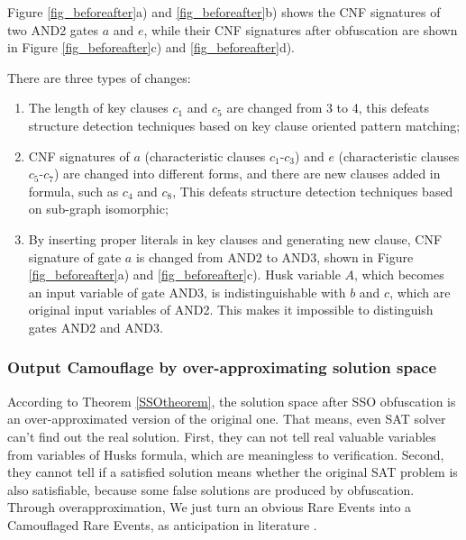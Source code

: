\documentclass[conference]{IEEEtran}
\begin{document}
Figure \ref{fig_beforeafter}a) and \ref{fig_beforeafter}b) shows the CNF signatures of two AND2 gates $a$ and $e$,
while their CNF signatures after obfuscation are shown in Figure \ref{fig_beforeafter}c) and \ref{fig_beforeafter}d).

There are three types of changes:
\begin{enumerate}
 \item
 The length of key clauses $c_1$ and $c_5$ are changed from 3 to 4,
this defeats structure detection techniques \cite{csFu} based on key clause oriented pattern matching;
 \item
CNF signatures of $a$ (characteristic clauses $c_1$-$c_3$) and $e$ (characteristic clauses $c_5$-$c_7$) are changed into different forms,
and there are new clauses added in formula, such as $c_4$ and $c_8$,
This defeats structure detection techniques\cite{csRoy} based on sub-graph isomorphic;
\item 
 By inserting proper literals in key clauses and generating new clause,
 CNF signature of gate $a$ is changed from AND2 to AND3,
shown in Figure \ref{fig_beforeafter}a) and \ref{fig_beforeafter}c).
Husk variable $A$,
which becomes an input variable of gate AND3,
is indistinguishable with $b$ and $c$,
which are original input variables of AND2.
This makes it impossible to distinguish gates AND2 and AND3.
\end{enumerate}

\subsubsection{Output Camouflage by over-approximating solution space}
According to Theorem \ref{SSOtheorem},
the solution space after SSO obfuscation is an over-approximated version of the original one.
That means, even SAT solver can't find out the real solution.
First, they can not tell real valuable variables from variables of Husks formula, 
which are meaningless to verification.
Second, they cannot tell if a satisfied solution means whether the original SAT problem is also satisfiable,
because some false solutions are produced by obfuscation.
Through overapproximation, We just turn an obvious Rare Events into a Camouflaged Rare Events, 
as anticipation in literature \cite{HV-grid} .
\end{document}
